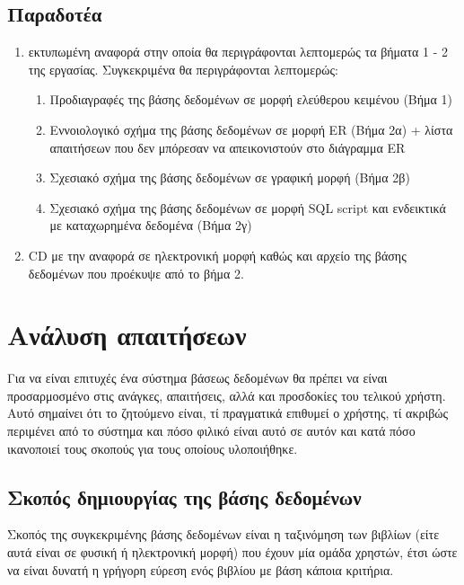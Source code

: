 \documentclass{assignment}
\begin{document}
\subsection{Παραδοτέα}

\begin{enumerate}

  \item εκτυπωμένη αναφορά στην οποία θα περιγράφονται λεπτομερώς τα βήματα 1 - 2 της εργασίας. Συγκεκριμένα θα περιγράφονται λεπτομερώς:

  \begin{enumerate}[i]
    \item Προδιαγραφές της βάσης δεδομένων σε μορφή ελεύθερου κειμένου (Βήμα 1)
    \item Εννοιολογικό σχήμα της βάσης δεδομένων σε μορφή ER (Βήμα 2α) + λίστα απαιτήσεων που δεν μπόρεσαν να απεικονιστούν στο διάγραμμα ER
    \item Σχεσιακό σχήμα της βάσης δεδομένων σε γραφική μορφή (Βήμα 2β)
    \item Σχεσιακό σχήμα της βάσης δεδομένων σε μορφή SQL script και ενδεικτικά  με καταχωρημένα δεδομένα (Βήμα 2γ)
  \end{enumerate}

  \item CD με την αναφορά σε ηλεκτρονική μορφή καθώς και αρχείο  της βάσης δεδομένων που προέκυψε από το βήμα 2.

\end{enumerate}

\section{Ανάλυση απαιτήσεων}

Για να είναι επιτυχές ένα σύστημα βάσεως δεδομένων θα πρέπει να είναι προσαρμοσμένο στις ανάγκες, απαιτήσεις, αλλά και προσδοκίες του τελικού χρήστη. Αυτό σημαίνει ότι το ζητούμενο είναι, τί πραγματικά επιθυμεί ο χρήστης, τί ακριβώς περιμένει από το σύστημα και πόσο φιλικό είναι αυτό σε αυτόν και κατά πόσο ικανοποιεί τους σκοπούς για τους οποίους υλοποιήθηκε.

\subsection{Σκοπός δημιουργίας της βάσης δεδομένων}

Σκοπός της συγκεκριμένης βάσης δεδομένων είναι η ταξινόμηση των βιβλίων (είτε αυτά είναι σε φυσική ή ηλεκτρονική μορφή) που έχουν μία ομάδα χρηστών, έτσι ώστε να είναι δυνατή η γρήγορη εύρεση ενός βιβλίου με βάση κάποια κριτήρια. 
\end{document}
